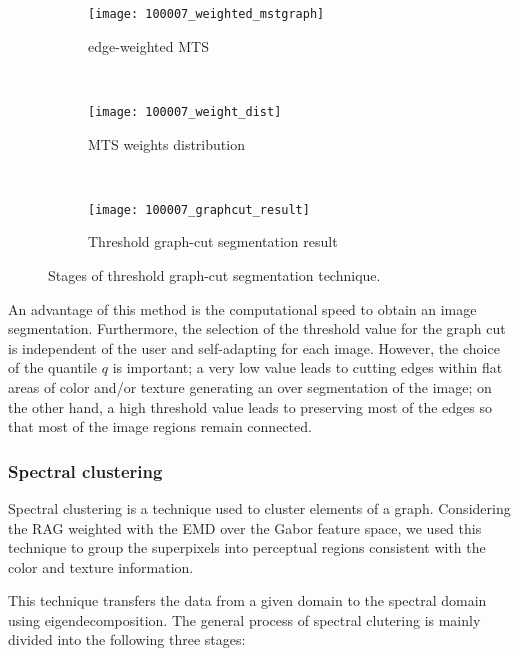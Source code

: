 \begin{figure}[!ht]
    \centering
    \begin{subfigure}[b]{0.32\textwidth}
    	\texttt{[image: 100007\_weighted\_mstgraph]}
    	\caption{edge-weighted MTS} 
    \end{subfigure}      
    ~ %
    \begin{subfigure}[b]{0.32\textwidth}
        \texttt{[image: 100007\_weight\_dist]}
        \caption{MTS weights distribution}
    \end{subfigure}    
    ~ %
    \begin{subfigure}[b]{0.45\textwidth}
        \texttt{[image: 100007\_graphcut\_result]}
        \caption{Threshold graph-cut segmentation result}
        \label{fig:graphcut_segmentation_result}
    \end{subfigure}  
	\caption{Stages of threshold graph-cut segmentation technique.}\label{fig:graphcut_segmentation_technique}    
\end{figure}


An advantage of this method is the computational speed to obtain an image segmentation. Furthermore, the selection of the threshold value for the graph cut is independent of the user and self-adapting for each image. However, the choice of the quantile $q$ is important; a very low value leads to cutting edges within flat areas of color and/or texture generating an over segmentation of the image; on the other hand, a high threshold value leads to preserving most of the edges so that most of the image regions remain connected.

\subsubsection{Spectral clustering}

Spectral clustering is a technique used to cluster elements of a graph. Considering the RAG weighted with the EMD over the Gabor feature space, we used this technique to group the superpixels into perceptual regions consistent with the color and texture information.

This technique transfers the data from a given domain to the spectral domain using eigendecomposition. The general process of spectral clutering is mainly divided into the following three stages:


